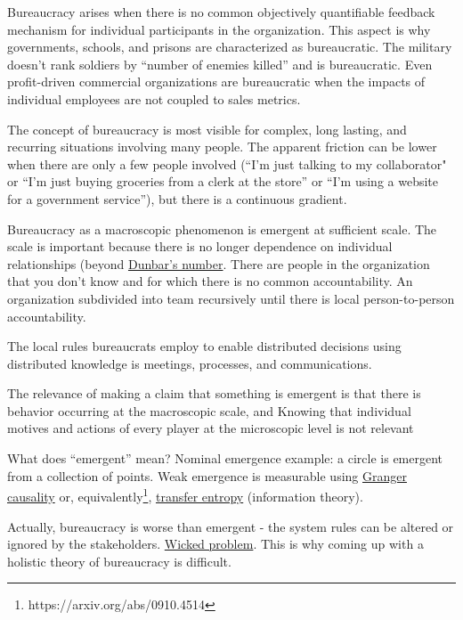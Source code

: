 Bureaucracy arises when there is no common objectively quantifiable feedback mechanism for individual participants in the organization. This aspect is why governments, schools, and prisons are characterized as bureaucratic. The military doesn't rank soldiers by ``number of enemies killed'' and is bureaucratic. Even profit-driven commercial organizations are bureaucratic when the impacts of individual employees are not coupled to sales metrics. 


The concept of bureaucracy is most visible for complex, long lasting, and recurring situations involving many people. The apparent friction can be lower when there are only a few people involved (``I'm just talking to my collaborator" or ``I'm just buying groceries from a clerk at the store'' or ``I'm using a website for a government service''), but there is a continuous gradient. 

Bureaucracy as a macroscopic phenomenon is emergent at sufficient scale. The scale is important because there is no longer dependence on individual relationships (beyond \href{https://en.wikipedia.org/wiki/Dunbar\%27s_number}{Dunbar's number}. There are people in the organization that you don't know and for which there is no common accountability. An organization subdivided into team recursively until there is local person-to-person accountability.  

The local rules bureaucrats employ to enable distributed decisions using distributed knowledge is meetings, processes, and communications. 

The relevance of making a claim that something is emergent is that there is behavior occurring at the macroscopic scale, and Knowing that individual motives and actions of every player at the microscopic level is not relevant

What does ``emergent'' mean? Nominal emergence example: a circle is emergent from a collection of points. Weak emergence is measurable using \href{https://en.wikipedia.org/wiki/Granger_causality}{Granger causality} or, equivalently\footnote{https://arxiv.org/abs/0910.4514}, \href{https://en.wikipedia.org/wiki/Transfer_entropy}{transfer entropy} (information theory). 

Actually, bureaucracy is worse than emergent - the system rules can be altered or ignored by the stakeholders. \href{https://en.wikipedia.org/wiki/Wicked_problem}{Wicked problem}. This is why coming up with a holistic theory of bureaucracy is difficult. 

